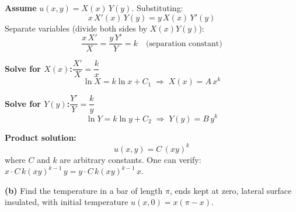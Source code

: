 \documentclass[12pt]{article}
\begin{document}
\begin{ansbox}
\textbf{Assume} $u(x,y)=X(x)\,Y(y)$. Substituting:
\[
  x\,X'(x)\,Y(y)=y\,X(x)\,Y'(y)
\]
Separate variables (divide both sides by $X(x)Y(y)$):
\[
  \frac{x\,X'}{X}=\frac{y\,Y'}{Y}=k\quad\text{(separation constant)}
\]

\textbf{Solve for $X(x)$:}\quad $\dfrac{X'}{X}=\dfrac{k}{x}$
\[
  \ln X = k\ln x+C_1\;\Rightarrow\; X(x)=A\,x^k
\]

\textbf{Solve for $Y(y)$:}\quad $\dfrac{Y'}{Y}=\dfrac{k}{y}$
\[
  \ln Y = k\ln y+C_2\;\Rightarrow\; Y(y)=B\,y^k
\]

\textbf{Product solution:}
\[
  \boxed{u(x,y)=C\,(xy)^k}
\]
where $C$ and $k$ are arbitrary constants. One can verify: $x\cdot C\,k(xy)^{k-1}\,y = y\cdot C\,k(xy)^{k-1}\,x$\;\checkmark.
\end{ansbox}

\medskip
\textbf{(b)} Find the temperature in a bar of length $\pi$, ends kept at zero, lateral surface insulated, with initial temperature $u(x,0)=x(\pi-x)$.
\end{document}
